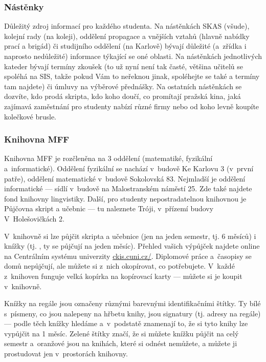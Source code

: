 \subsubsection{Nástěnky}
Důležitý zdroj informací pro každého studenta. Na nástěnkách SKAS
(všude), kolejní rady (na koleji), oddělení propagace a vnějších
vztahů (hlavně nabídky prací a brigád) či studijního oddělení (na
Karlově) bývají důležité (a~zřídka i naprosto nedůležité)
informace týkající se oné oblasti. Na nástěnkách jednotlivých
kateder bývají termíny zkoušek (to už nyní není tak časté, většina
učitelů se spoléhá na SIS, takže pokud Vám to neřeknou jinak,
spoléhejte se také a termíny tam najdete) či úmluvy na výběrové
přednášky. Na ostatních nástěnkách se dozvíte, kdo prodá skripta,
kdo koho doučí, co promítají pražská kina, jaká zajímavá
zaměstnání pro studenty nabízí různé firmy nebo od koho levně
koupíte kolečkové brusle.


\subsubsection{Knihovna MFF}

Knihovna MFF je rozčleněna na 3 oddělení (matematiké, fyzikální
a~informatické). Oddělení fyzikální se nachází v~budově Ke Karlovu 3
(v~první patře), oddělení matematické v~budově Sokolovská 83.
Nejmladší je oddělení informatické --- sídlí v~budově na
Malostranském náměstí 25. Zde také najdete fond knihovny
lingvistiky. Další, pro studenty nepostradatelnou knihovnou je
Půjčovna skript a učebnic --- tu naleznete Tróji, v~přízemí budovy
V~Holešovičkách 2.

V~knihovně si lze půjčit skripta a učebnice (jen na jeden semestr,
tj. 6 měsíců) i knížky (tj. , ty se půjčují na
jeden měsíc). Přehled vašich výpůjček najdete online na Centrálním
systému univerzity \url{ckis.cuni.cz/}. Diplomové práce
a~časopisy se domů nepůjčují, ale můžete si z~nich okopírovat, co
potřebujete. V~každé z~knihoven funguje velká kopírka na
kopírovací karty --- můžete si je koupit v~knihovně.

Knížky na regále jsou označeny různými barevnými identifikačními
štítky. Ty bílé s~písmeny, co jsou nalepeny na hřbetu knihy, jsou
signatury (tj. adresy na regále) --- podle těch knížky hledáme
a~v~podstatě znamenají to, že si tyto knihy lze vypůjčit na 1 měsíc.
Zelené štítky značí, že si můžete knížku půjčit na celý semestr
a~oranžové jsou na knihách, které si odnést nemůžete, a můžete ji
prostudovat jen v~prostorách knihovny.

